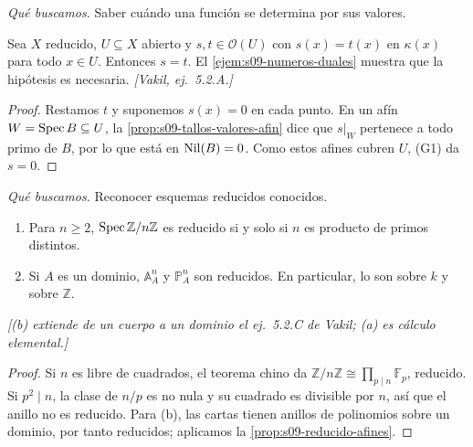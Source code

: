 \begin{center}
\end{center}

\emph{Qué buscamos.} Saber cuándo una función se determina por sus valores.

\begin{prop}
\label{prop:s09-funciones-valores}
Sea $X$ reducido, $U\subseteq X$ abierto y $s,t\in\mathcal O(U)$ con $s(x)=t(x)$ en $\kappa(x)$ para todo $x\in U$. Entonces $s=t$. El \cref{ejem:s09-numeros-duales} muestra que la hipótesis es necesaria. \emph{[Vakil, ej.~5.2.A.]}
\end{prop}
\begin{proof}
Restamos $t$ y suponemos $s(x)=0$ en cada punto. En un afín $W=\operatorname{Spec} B\subseteq U$, la \cref{prop:s09-tallos-valores-afin} dice que $s|_W$ pertenece a todo primo de $B$, por lo que está en $\operatorname{Nil}(B)=0$. Como estos afines cubren $U$, (G1) da $s=0$.
\end{proof}

\emph{Qué buscamos.} Reconocer esquemas reducidos conocidos.

\begin{ejem}
\label{ejem:s09-reducidos}
\begin{enumerate}[label=(\alph*)]
\item Para $n\ge2$, $\operatorname{Spec}\mathbb Z/n\mathbb Z$ es reducido si y solo si $n$ es producto de primos distintos.
\item Si $A$ es un dominio, $\mathbb A^n_A$ y $\mathbb P^n_A$ son reducidos. En particular, lo son sobre $k$ y sobre $\mathbb Z$.
\end{enumerate}
\emph{[(b) extiende de un cuerpo a un dominio el ej.~5.2.C de Vakil; (a) es cálculo elemental.]}
\end{ejem}
\begin{proof}
Si $n$ es libre de cuadrados, el teorema chino da $\mathbb Z/n\mathbb Z\cong\prod_{p\mid n}\mathbb F_p$, reducido. Si $p^2\mid n$, la clase de $n/p$ es no nula y su cuadrado es divisible por $n$, así que el anillo no es reducido. Para (b), las cartas tienen anillos de polinomios sobre un dominio, por tanto reducidos; aplicamos la \cref{prop:s09-reducido-afines}.
\end{proof}

